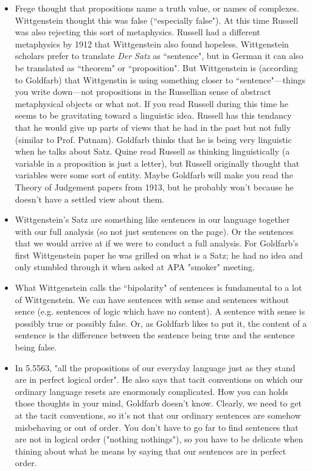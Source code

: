 \documentclass[12pt]{article}
\theoremstyle{definition}
\begin{document}
\begin{itemize}
    \item Frege thought that propositions name a truth value, or names of complexes. Wittgenstein thought this was false (``especially false"). At this time Russell was also rejecting this sort of metaphysics. Russell had a different metaphysics by 1912 that Wittgenstein also found hopeless. Wittgenstein scholars prefer to translate \textit{Der Satz} as ``sentence", but in German it can also be translated as ``theorem" or ``proposition". But Wittgenstein is (according to Goldfarb) that Wittgenstin is using something closer to ``sentence"---things you write down---not propositions in the Russellian sense of abstract metaphysical objects or what not. If you read Russell during this time he seems to be gravitating toward a linguistic idea. Russell has this tendancy that he would give up parts of views that he had in the past but not fully (similar to Prof. Putnam). Goldfarb thinks that he is being very linguistic when he talks about Satz. Quine read Russell as thinking linguistically (a variable in a proposition is just a letter), but Russell originally thought that variables were some sort of entity. Maybe Goldfarb will make you read the Theory of Judgement papers from 1913, but he probably won't because he doesn't have a settled view about them.
    \item Wittgenstein's Satz are something like sentences in our language together with our full analysis (so not just sentences on the page). Or the sentences that we would arrive at if we were to conduct a full analysis. For Goldfarb's first Wittgenstein paper he was grilled on what is a Satz; he had no idea and only stumbled through it when asked at APA "smoker" meeting.
    \item What Wittgenstein calls the ``bipolarity" of sentences is fundamental to a lot of Wittgenstein. We can have sentences with sense and sentences without sence (e.g. sentences of logic which have no content). A sentence with sense is possibly true or possibly false. Or, as Goldfarb likes to put it, the content of a sentence is the difference between the sentence being true and the sentence being false.
    \item In 5.5563, "all the propositions of our everyday language just as they stand are in perfect logical order". He also says that tacit conventions on which our ordinary language resets are enormously complicated. How you can holds those thoughts in your mind, Goldfarb doesn't know. Clearly, we need to get at the tacit conventions, so it's not that our ordinary sentences are somehow misbehaving or out of order. You don't have to go far to find sentences that are not in logical order ("nothing nothings"), so you have to be delicate when thining about what he means by saying that our sentences are in perfect order.

\end{itemize}
\end{document}
